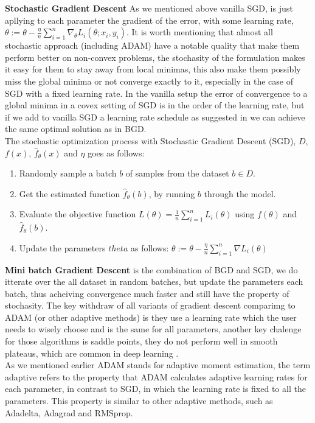 \documentclass[10pt,a4paper]{article}
\begin{document}
\textbf{Stochastic Gradient Descent} As we mentioned above vanilla SGD, is just apllying to each parameter the gradient of the error, with some learning rate, $\theta:=\theta-\frac{\eta}{n}\sum_{i=1}^{n}\nabla_\theta L_i(\theta;x_i,y_i)$. It is worth mentioning that almost all stochastic approach (including ADAM) have a notable quality that make them perform better on non-convex problems, the stochasity of the formulation makes it easy for them to stay away from local minimas, this also make them possibly miss the global minima or not converge exactly to it, especially in the case of SGD with a fixed learning rate. In the vanilla setup the error of convergence to a global minima in a covex setting of SGD is in the order of the learning rate, but if we add to vanilla SGD a learning rate schedule as suggested in \cite{darken1992learning} we can achieve the same optimal solution as in BGD.\\
The stochastic optimization process with Stochastic Gradient Descent (SGD), $D$, $f(x)$, $\hat{f}_{\theta}(x)$ and $\eta$  goes as follows:
\begin{enumerate} 
    \item Randomly sample a batch $b$ of samples from the dataset $b \in D$.
    \item Get the estimated function $\hat{f}_{\theta}(b)$, by running $b$ through the model.
    \item Evaluate the objective function $L(\theta) = \frac{1}{n} \sum_{i=1}^{n} L_i(\theta)$ using $f(\theta)$ and $\hat{f}_{\theta}(b)$.
    \item Update the parameters $theta$ as follows: $\theta:=\theta-\frac{\eta}{n}\sum_{i=1}^{n}\nabla L_i(\theta)$
\end{enumerate}



\textbf{Mini batch Gradient Descent} is the combination of BGD and SGD, we do itterate over the all dataset in random batches, but update the parameters each batch, thus acheiving convergence much faster and still have the property of stochasity.
The key withdraw of all variants of gradient descent comparimg to ADAM (or other adaptive methods) is they use a learning rate which the user needs to wisely choose and is the same for all parameters, another key chalenge for those algorithms is saddle points, they do not perform well in smooth plateaus, which are common in deep learning \cite{dauphin2014identifying}.\\
As we mentioned earlier ADAM stands for adaptive moment estimation, the term adaptive refers to the property that ADAM calculates adaptive learning rates for each parameter, in contrast to SGD, in which the learning rate is fixed to all the parameters. This property is similar to other adaptive methods, such as Adadelta, Adagrad and RMSprop.\\
\end{document}
